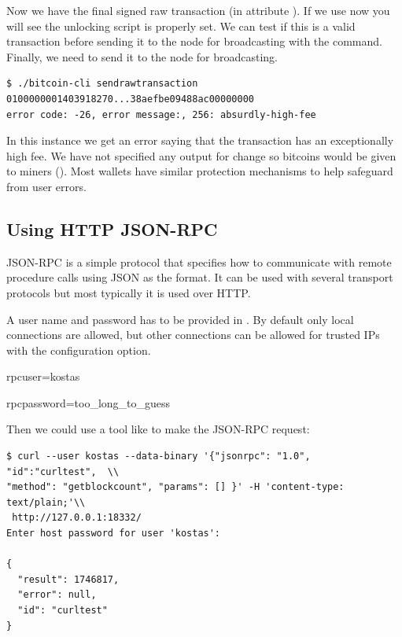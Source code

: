 Now we have the final signed raw transaction (in attribute ). If we use  now you will see the unlocking script is properly set. We can test if this is a valid transaction before sending it to the node for broadcasting with the  command. Finally, we need to send it to the node for broadcasting.

\begin{emphbox}
\begin{lstlisting}[style=Bash]
$ ./bitcoin-cli sendrawtransaction 0100000001403918270...38aefbe09488ac00000000
error code: -26, error message:, 256: absurdly-high-fee
\end{lstlisting}
\end{emphbox}

In this instance we get an error saying that the transaction has an exceptionally high fee. We have not specified any output for change so  bitcoins would be given to miners (). Most wallets have similar protection mechanisms to help safeguard from user errors.


\subsection*{Using HTTP JSON-RPC}

JSON-RPC is a simple protocol that specifies how to communicate with remote procedure calls using JSON as the format. It can be used with several transport protocols but most typically it is used over HTTP.

A user name and password has to be provided in . By default only local connections are allowed, but other connections can be allowed for trusted IPs with the  configuration option.

\begin{emphbox}
rpcuser=kostas

rpcpassword=too\_long\_to\_guess
\end{emphbox}

Then we could use a tool like  to make the JSON-RPC request:

\begin{emphbox}
\begin{lstlisting}[style=Bash]
$ curl --user kostas --data-binary '{"jsonrpc": "1.0", "id":"curltest",  \\
"method": "getblockcount", "params": [] }' -H 'content-type: text/plain;'\\
 http://127.0.0.1:18332/
Enter host password for user 'kostas':

{
  "result": 1746817,
  "error": null,
  "id": "curltest"
}
\end{lstlisting}
\end{emphbox}

